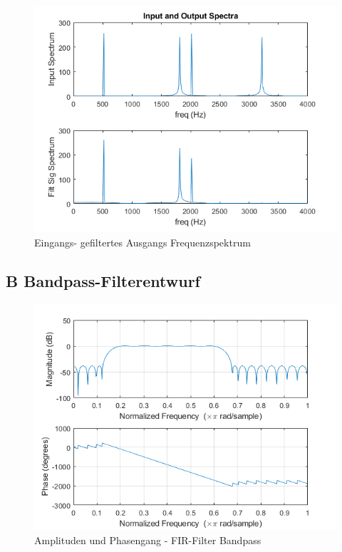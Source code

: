 \clearpage

\begin{figure}[h]
\centering
\includegraphics[width=0.7\linewidth]{./Bilder/Attachment_A2_fir_2b_Spektrum}
\caption{Eingangs- gefiltertes Ausgangs Frequenzspektrum}
\label{fig:Attachment_A2_fir_2b_Spektrum}
\end{figure}


\clearpage

\subsection{B Bandpass-Filterentwurf}





\begin{figure}[h]
\centering
\includegraphics[width=0.7\linewidth]{./Bilder/Attachment_B_fir_3_Amplitudengang}
\caption{Amplituden und Phasengang - FIR-Filter Bandpass}
\label{fig:Attachment_B_fir_3_Amplitudengang}
\end{figure}

